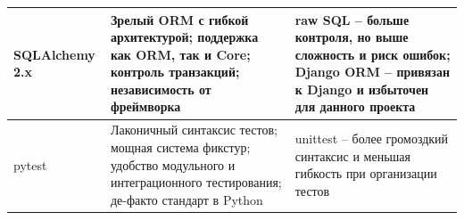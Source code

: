 \begin{tabularx}{\textwidth}{|p{3.8cm}|Z|Z|}
\hline

SQLAlchemy 2.x &
Зрелый ORM с гибкой архитектурой; поддержка как ORM, так и Core; контроль транзакций; независимость от фреймворка &
raw SQL -- больше контроля, но выше сложность и риск ошибок; Django ORM -- привязан к Django и избыточен для данного проекта \\

\hline

pytest &
Лаконичный синтаксис тестов; мощная система фикстур; удобство модульного и интеграционного тестирования; де-факто стандарт в Python &
unittest -- более громоздкий синтаксис и меньшая гибкость при организации тестов \\

\hline

\end{tabularx}	